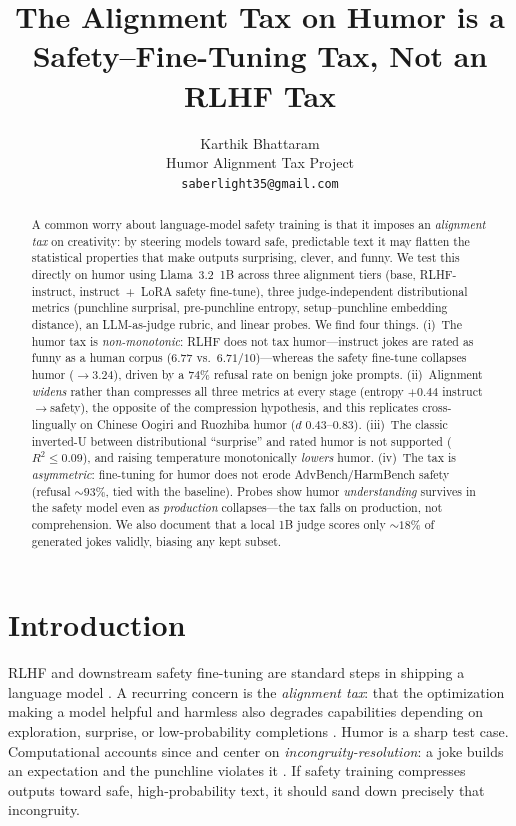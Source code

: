 \documentclass{article}
\title{The Alignment Tax on Humor is a Safety--Fine-Tuning Tax, Not an RLHF Tax}
\author{%
  Karthik Bhattaram \\
  Humor Alignment Tax Project \\
  \texttt{saberlight35@gmail.com} \\
}
\begin{document}
\maketitle


\begin{abstract}
A common worry about language-model safety training is that it imposes an \emph{alignment tax} on creativity: by steering models toward safe, predictable text it may flatten the statistical properties that make outputs surprising, clever, and funny. We test this directly on humor using Llama~3.2~1B across three alignment tiers (base, RLHF-instruct, instruct~+~LoRA safety fine-tune), three judge-independent distributional metrics (punchline surprisal, pre-punchline entropy, setup--punchline embedding distance), an LLM-as-judge rubric, and linear probes. We find four things. (i)~The humor tax is \emph{non-monotonic}: RLHF does not tax humor---instruct jokes are rated as funny as a human corpus ($6.77$ vs.\ $6.71$/$10$)---whereas the safety fine-tune collapses humor ($\to 3.24$), driven by a $74\%$ refusal rate on benign joke prompts. (ii)~Alignment \emph{widens} rather than compresses all three metrics at every stage (entropy $+0.44$ instruct$\to$safety), the opposite of the compression hypothesis, and this replicates cross-lingually on Chinese Oogiri and Ruozhiba humor ($d$ $0.43$--$0.83$). (iii)~The classic inverted-U between distributional ``surprise'' and rated humor is not supported ($R^2\le0.09$), and raising temperature monotonically \emph{lowers} humor. (iv)~The tax is \emph{asymmetric}: fine-tuning for humor does not erode AdvBench/HarmBench safety (refusal $\sim$$93\%$, tied with the baseline). Probes show humor \emph{understanding} survives in the safety model even as \emph{production} collapses---the tax falls on production, not comprehension. We also document that a local 1B judge scores only $\sim$$18\%$ of generated jokes validly, biasing any kept subset.
\end{abstract}


\section{Introduction}

RLHF and downstream safety fine-tuning are standard steps in shipping a language model \citep{ouyang2022instructgpt,bai2022hh,rafailov2023dpo}. A recurring concern is the \emph{alignment tax}: that the optimization making a model helpful and harmless also degrades capabilities depending on exploration, surprise, or low-probability completions \citep{askell2021general,bai2022hh}. Humor is a sharp test case. Computational accounts since \citet{raskin1985semantic} and \citet{attardo1991ssth} center on \emph{incongruity-resolution}: a joke builds an expectation and the punchline violates it \citep{suls1972two}. If safety training compresses outputs toward safe, high-probability text, it should sand down precisely that incongruity.
\end{document}
